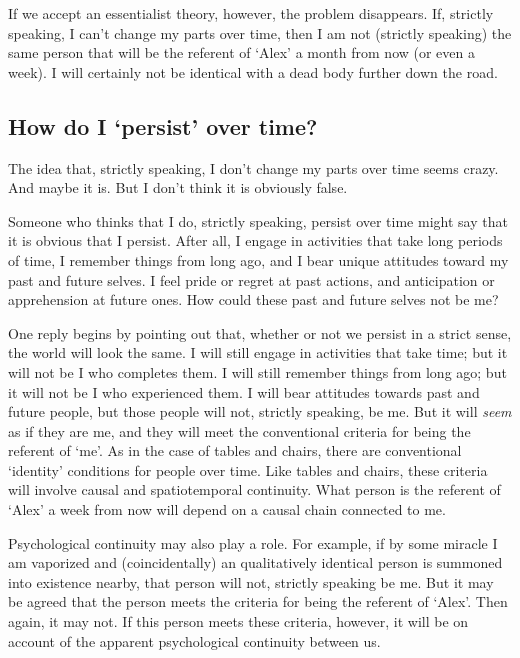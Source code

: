 \documentclass[11pt]{article}
\begin{document}
\begin{spacing}{1.5}
If we accept an essentialist theory, however, the problem disappears.
If, strictly speaking, I can't change my parts over time, then I am
not (strictly speaking) the same person that will be the referent of
`Alex' a month from now (or even a week).  I will certainly not be
identical with a dead body further down the road.

\subsection{How do I `persist' over time?}
\label{person-persist}
The idea that, strictly speaking, I don't change my parts over time
seems crazy.  And maybe it is.  But I don't think it is obviously
false.

Someone who thinks that I do, strictly speaking, persist over time
might say that it is obvious that I persist.  After all, I engage in
activities that take long periods of time, I remember things from long
ago, and I bear unique attitudes toward my past and future selves.  I
feel pride or regret at past actions, and anticipation or apprehension
at future ones.  How could these past and future selves not be me?

One reply begins by pointing out that, whether or not we persist in a
strict sense, the world will look the same.  I will still engage in
activities that take time; but it will not be I who completes them.  I
will still remember things from long ago; but it will not be I who
experienced them.  I will bear attitudes towards past and future
people, but those people will not, strictly speaking, be me.  But it
will {\em seem} as if they are me, and they will meet the conventional
criteria for being the referent of `me'.  As in the case of tables and
chairs, there are conventional `identity' conditions for people over
time.  Like tables and chairs, these criteria will involve causal and
spatiotemporal continuity.  What person is the referent of `Alex' a
week from now will depend on a causal chain connected to me.

Psychological continuity may also play a role.  For example, if by
some miracle I am vaporized and (coincidentally) an qualitatively
identical person is summoned into existence nearby, that person will
not, strictly speaking be me.  But it may be agreed that the person
meets the criteria for being the referent of `Alex'.  Then again, it
may not.  If this person meets these criteria, however, it will be on
account of the apparent psychological continuity between us.


\end{spacing}
\end{document}
